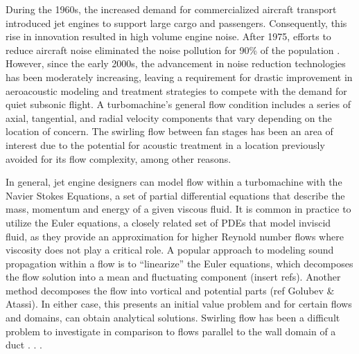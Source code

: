 During the 1960s, the increased demand for commercialized aircraft transport
introduced jet engines to support large cargo and passengers. Consequently,
this rise in innovation resulted in high volume engine noise. After 1975, 
efforts to reduce aircraft noise eliminated the noise pollution for 90\% of
the population \cite{FAAPolicy}. However, since the early 2000s,
the advancement in noise reduction technologies has been moderately increasing,
leaving a requirement for drastic improvement in aeroacoustic modeling and treatment
strategies to compete with the demand for quiet subsonic flight.  
A turbomachine's general flow condition includes a series of axial, tangential,
and radial velocity components that vary depending on the location of concern.
The swirling flow between fan stages has been an area of interest due to the
potential for acoustic treatment in a location previously avoided for its flow complexity, among 
other reasons.

In general, jet engine designers can model flow within a turbomachine with 
the Navier Stokes Equations, a set 
of partial differential equations that describe the mass, momentum and energy
of a given viscous fluid. It is common in practice to utilize the Euler equations,
a closely related set of PDEs that model inviscid fluid, as they provide an 
approximation for higher Reynold number flows where viscosity 
does not play a critical role. A popular approach to modeling sound propagation 
within a flow is to ``linearize'' the Euler equations, which decomposes the 
flow solution into a mean and fluctuating component (insert refs). Another method
decomposes the flow into vortical and potential parts (ref Golubev \& Atassi). 
In either case, this presents an initial value problem and for certain flows and
domains, can obtain analytical solutions.  Swirling flow has been a difficult
problem to investigate in comparison to flows parallel to the wall domain of a duct \cite{COOPER2001}.   
. 
.




%
%
%
%
%
%
%
